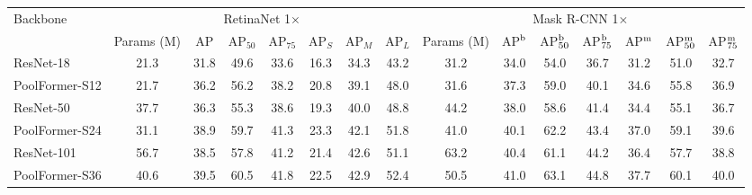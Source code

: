\begin{tabular}{l|c|ccc|ccc|c|ccc|ccc}
\toprule
\multirow{2}{*}{Backbone} & \multicolumn{7}{c|}{RetinaNet 1$\times$} & \multicolumn{7}{c}{Mask R-CNN 1$\times$} \\
\cline{2-15}
& Params (M) & AP & AP$_{50}$ &AP$_{75}$ & AP$_S$ & AP$_M$ & AP$_L$ & Params (M) & AP$^{\rm b}$ &AP$_{50}^{\rm b}$ &AP$_{75}^{\rm b}$  &AP$^{\rm m}$ &AP$_{50}^{\rm m}$ &AP$_{75}^{\rm m}$ \\
\whline
\resnetdot{} ResNet-18~\cite{resnet}  & 21.3 & 31.8 & 49.6 & 33.6 & 16.3 & 34.3 & 43.2 & 31.2 &  34.0 & 54.0 & 36.7 & 31.2 & 51.0 & 32.7 \\
\poolformer{} PoolFormer-S12          & 21.7 & 36.2 & 56.2 & 38.2 & 20.8 & 39.1 & 48.0 & 31.6 &  37.3 & 59.0 & 40.1 & 34.6 & 55.8 & 36.9 \\
\hline
\resnetdot{} ResNet-50~\cite{resnet}  & 37.7 & 36.3 & 55.3 & 38.6 & 19.3 & 40.0 & 48.8 & 44.2 &  38.0 & 58.6 & 41.4 & 34.4 & 55.1 & 36.7 \\
\poolformer{} PoolFormer-S24          & 31.1 & 38.9 & 59.7 & 41.3 & 23.3 & 42.1 & 51.8 & 41.0 &  40.1 & 62.2 & 43.4 & 37.0 & 59.1 & 39.6 \\
\hline
\resnetdot{} ResNet-101~\cite{resnet}  & 56.7 & 38.5 & 57.8 & 41.2 & 21.4 & 42.6 & 51.1 & 63.2 &  40.4 & 61.1 & 44.2 & 36.4 & 57.7 & 38.8 \\
\poolformer{} PoolFormer-S36           & 40.6 & 39.5 & 60.5 & 41.8 & 22.5 & 42.9 & 52.4 & 50.5 &  41.0 & 63.1 & 44.8 & 37.7 & 60.1 & 40.0 \\ 
\bottomrule
\end{tabular}